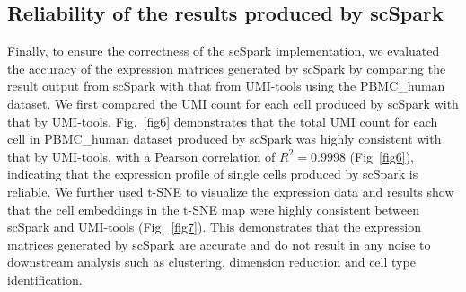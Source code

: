 \documentclass[conference]{IEEEtran}
\begin{document}



\subsection{Reliability of the results produced by scSpark} 
Finally, to ensure the correctness of the scSpark implementation, we evaluated the accuracy of the expression matrices generated by scSpark by comparing the result output from scSpark with that from UMI-tools using the PBMC\_human dataset. 
We first compared the UMI count for each cell produced by scSpark with that by UMI-tools. 
Fig.~\ref{fig6} demonstrates that the total UMI count for each cell in PBMC\_human dataset produced by scSpark was highly consistent with that by UMI-tools, with a Pearson correlation of $R^{2} = 0.9998$ (Fig~\ref{fig6}), indicating that the expression profile of single cells produced by scSpark is reliable.
We further used t-SNE to visualize the expression data and results show that the cell embeddings in the t-SNE map were highly consistent between scSpark and UMI-tools (Fig.~\ref{fig7}).
This demonstrates that the expression matrices generated by scSpark are accurate and do not result in any noise to downstream analysis such as clustering, dimension reduction and cell type identification. 
\end{document}
